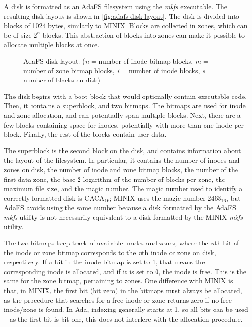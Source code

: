 A disk is formatted as an AdaFS filesystem using the \textit{mkfs} executable.
The resulting disk layout is shown in \autoref{fig:adafs disk layout}.
The disk is divided into blocks of 1024 bytes, similarly to MINIX.
Blocks are collected in zones, which can be of size $2^n$ blocks.
This abstraction of blocks into zones can make it possible to allocate multiple blocks at once.

\begin{figure}[h]
  \centering
  \caption{AdaFS disk layout. (\textit{n} = number of inode bitmap blocks, \textit{m} = number of zone bitmap blocks, \textit{i} = number of inode blocks, \textit{s} = number of blocks on disk)}
  \label{fig:adafs disk layout}
\end{figure}

The disk begins with a boot block that would optionally contain executable code.
Then, it contains a superblock, and two bitmaps.
The bitmaps are used for inode and zone allocation, and can potentially span multiple blocks.
Next, there are a few blocks containing space for inodes, potentially with more than one inode per block.
Finally, the rest of the blocks contain user data.

The superblock is the second block on the disk, and contains information about the layout of the filesystem.
In particular, it contains the number of inodes and zones on disk, the number of inode and zone bitmap blocks, the number of the first data zone, the base-2 logarithm of the number of blocks per zone, the maximum file size, and the magic number.
The magic number used to identify a correctly formatted disk is $\text{CACA}_{16}$; MINIX uses the magic number $2468_{16}$, but AdaFS avoids using the same number because a disk formatted by the AdaFS \textit{mkfs} utility is not necessarily equivalent to a disk formatted by the MINIX \textit{mkfs} utility.

The two bitmaps keep track of available inodes and zones, where the \textit{n}th bit of the inode or zone bitmap corresponds to the \textit{n}th inode or zone on disk, respectively.
If a bit in the inode bitmap is set to 1, that means the corresponding inode is allocated, and if it is set to 0, the inode is free.
This is the same for the zone bitmap, pertaining to zones.
One difference with MINIX is that, in MINIX, the first bit (bit zero) in the bitmaps must always be allocated, as the procedure that searches for a free inode or zone returns zero if no free inode/zone is found.
In Ada, indexing generally starts at 1, so all bits can be used -- as the first bit is bit one, this does not interfere with the allocation procedure.

